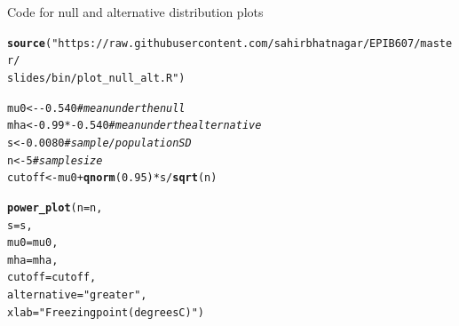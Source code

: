 \documentclass[10pt]{beamer}\usepackage[]{graphicx}\usepackage[]{color}
\makeatletter
\newcommand{\hlnum}[1]{\textcolor[rgb]{0.686,0.059,0.569}{#1}}%
\newcommand{\hlstr}[1]{\textcolor[rgb]{0.192,0.494,0.8}{#1}}%
\newcommand{\hlcom}[1]{\textcolor[rgb]{0.678,0.584,0.686}{\textit{#1}}}%
\newcommand{\hlopt}[1]{\textcolor[rgb]{0,0,0}{#1}}%
\newcommand{\hlstd}[1]{\textcolor[rgb]{0.345,0.345,0.345}{#1}}%
\newcommand{\hlkwb}[1]{\textcolor[rgb]{0.69,0.353,0.396}{#1}}%
\newcommand{\hlkwc}[1]{\textcolor[rgb]{0.333,0.667,0.333}{#1}}%
\newcommand{\hlkwd}[1]{\textcolor[rgb]{0.737,0.353,0.396}{\textbf{#1}}}%
\newenvironment{kframe}{%
 \def\at@end@of@kframe{}%
 \ifinner\ifhmode%
  \def\at@end@of@kframe{\end{minipage}}%
  \begin{minipage}{\columnwidth}%
 \fi\fi%
 \def\FrameCommand##1{\hskip\@totalleftmargin \hskip-\fboxsep
 \colorbox{shadecolor}{##1}\hskip-\fboxsep
     \hskip-\linewidth \hskip-\@totalleftmargin \hskip\columnwidth}%
 \MakeFramed {\advance\hsize-\width
   \@totalleftmargin\z@ \linewidth\hsize
   \@setminipage}}%
 {\par\unskip\endMakeFramed%
 \at@end@of@kframe}
\newenvironment{knitrout}{}{} %
\makeatother
\begin{document}
\begin{frame}[fragile]{Code for null and alternative distribution plots}
\begin{knitrout}\tiny
{}\color{fgcolor}\begin{kframe}
\begin{alltt}
\hlkwd{source}\hlstd{(}\hlstr{"https://raw.githubusercontent.com/sahirbhatnagar/EPIB607/master/
        slides/bin/plot_null_alt.R"}\hlstd{)}

\hlstd{mu0} \hlkwb{<-} \hlopt{-}\hlnum{0.540} \hlcom{# mean under the null}
\hlstd{mha} \hlkwb{<-} \hlnum{0.99}\hlopt{*-}\hlnum{0.540} \hlcom{# mean under the alternative}
\hlstd{s} \hlkwb{<-} \hlnum{0.0080} \hlcom{# sample/population SD}
\hlstd{n} \hlkwb{<-} \hlnum{5} \hlcom{# sample size}
\hlstd{cutoff} \hlkwb{<-} \hlstd{mu0} \hlopt{+} \hlkwd{qnorm}\hlstd{(}\hlnum{0.95}\hlstd{)} \hlopt{*} \hlstd{s} \hlopt{/} \hlkwd{sqrt}\hlstd{(n)}

\hlkwd{power_plot}\hlstd{(}\hlkwc{n} \hlstd{= n,}
\hlkwc{s} \hlstd{= s,}
\hlkwc{mu0} \hlstd{= mu0,}
\hlkwc{mha} \hlstd{= mha,}
\hlkwc{cutoff} \hlstd{= cutoff,}
\hlkwc{alternative} \hlstd{=} \hlstr{"greater"}\hlstd{,}
\hlkwc{xlab} \hlstd{=} \hlstr{"Freezing point (degrees C)"}\hlstd{)}
\end{alltt}
\end{kframe}
\end{knitrout}
\end{frame}
\end{document}
